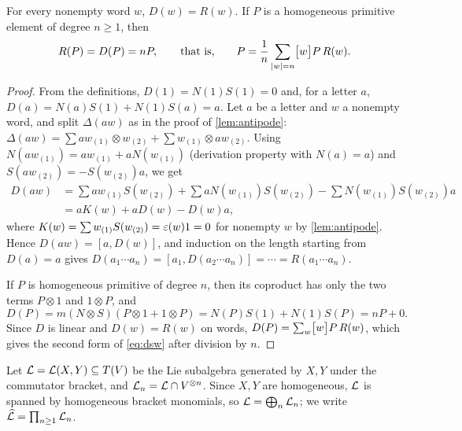 \begin{lemma}\label{lem:dsw}
For every nonempty word $w$, $D(w)=R(w)$. If $P$ is a homogeneous primitive
element of degree $n\geq1$, then
\begin{equation}\label{eq:dsw}
 R(P)=D(P)=nP,\qquad\text{that is,}\qquad
 P=\frac1n\sum_{|w|=n}\bigl[w\bigr]P\,R(w).
\end{equation}
\end{lemma}
\begin{proof}
From the definitions, $D(1)=N(1)S(1)=0$ and, for a letter $a$,
$D(a)=N(a)S(1)+N(1)S(a)=a$. Let $a$ be a letter and $w$ a nonempty word, and
split $\Delta(aw)$ as in the proof of \cref{lem:antipode}:
$\Delta(aw)=\sum aw_{(1)}\otimes w_{(2)}+\sum w_{(1)}\otimes aw_{(2)}$.
Using $N(aw_{(1)})=aw_{(1)}+aN(w_{(1)})$ (derivation property with
$N(a)=a$) and $S(aw_{(2)})=-S(w_{(2)})a$, we get
\begin{align*}
 D(aw)
 &=\sum aw_{(1)}S(w_{(2)})+\sum aN(w_{(1)})S(w_{(2)})
   -\sum N(w_{(1)})S(w_{(2)})a\\
 &=aK(w)+aD(w)-D(w)a,
\end{align*}
where $K(w)=\sum w_{(1)}S(w_{(2)})=\varepsilon(w)1=0$ for nonempty $w$ by
\cref{lem:antipode}. Hence $D(aw)=[a,D(w)]$, and induction on the length
starting from $D(a)=a$ gives $D(a_1\cdots a_n)=[a_1,D(a_2\cdots a_n)]
=\cdots=R(a_1\cdots a_n)$.

If $P$ is homogeneous primitive of degree $n$, then its coproduct has only
the two terms $P\otimes1$ and $1\otimes P$, and
\[
 D(P)=m(N\otimes S)(P\otimes1+1\otimes P)=N(P)S(1)+N(1)S(P)=nP+0.
\]
Since $D$ is linear and $D(w)=R(w)$ on words, $D(P)=\sum_w\bigl[w\bigr]P\,R(w)$,
which gives the second form of \eqref{eq:dsw} after division by $n$.
\end{proof}

Let $\mathcal{L}=\mathcal{L}(X,Y)\subseteq T(V)$ be the Lie subalgebra generated by $X,Y$
under the commutator bracket, and $\mathcal{L}_n=\mathcal{L}\cap V^{\otimes n}$. Since
$X,Y$ are homogeneous, $\mathcal{L}$ is spanned by homogeneous bracket monomials, so
$\mathcal{L}=\bigoplus_n\mathcal{L}_n$; we write $\widehat{\mathcal{L}}=\prod_{n\geq1}\mathcal{L}_n$.

